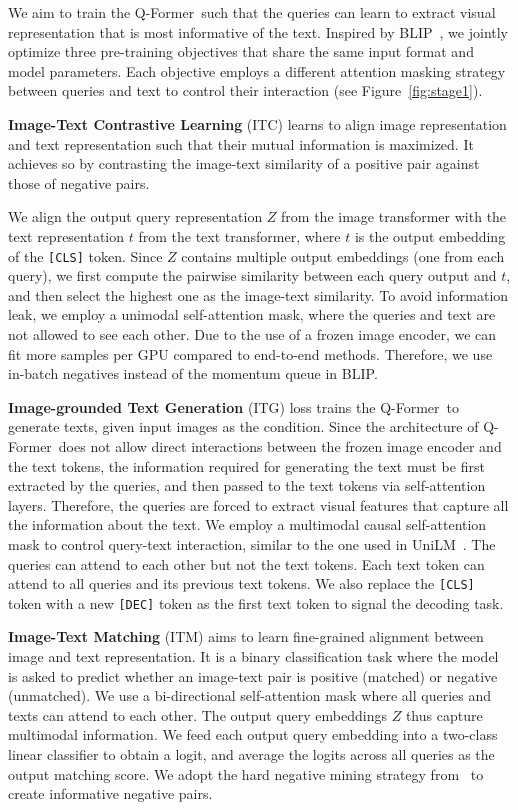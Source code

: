 We aim to train the Q-Former~such that the queries can learn to extract visual representation that is most informative of the text. Inspired by BLIP~\cite{blip}, we jointly optimize three pre-training objectives that share the same input format and model parameters. Each objective employs a different attention masking strategy between queries and text to control their interaction (see Figure~\ref{fig:stage1}).

\textbf{Image-Text Contrastive Learning} (ITC) learns to align image representation and text representation such that their mutual information is maximized. It achieves so by contrasting the image-text similarity of a positive pair against those of negative pairs.

We align the output query representation $Z$ from the image transformer with the text representation $t$ from the text transformer, where $t$ is the output embedding of the \texttt{[CLS]} token. Since $Z$ contains multiple output embeddings (one from each query), we first compute the pairwise similarity between each query output and $t$, and then select the highest one as the image-text similarity. To avoid information leak, we employ a unimodal self-attention mask, where the queries and text are not allowed to see each other. Due to the use of a frozen image encoder, we can fit more samples per GPU compared to end-to-end methods. Therefore, we use in-batch negatives instead of the momentum queue in BLIP.

\textbf{Image-grounded Text Generation} (ITG) loss trains the Q-Former~to generate texts, given input images as the condition. Since the architecture of Q-Former~does not allow direct interactions between the frozen image encoder and the text tokens, the information required for generating the text must be first extracted by the queries, and then passed to the text tokens via self-attention layers. Therefore, the queries are forced to extract visual features that capture all the information about the text. We employ a multimodal causal self-attention mask to control query-text interaction, similar to the one used in UniLM~\cite{UniLM}. The queries can attend to each other but not the text tokens. Each text token can attend to all queries and its previous text tokens. We also replace the \texttt{[CLS]} token with a new \texttt{[DEC]} token as the first text token to signal the decoding task.

\textbf{Image-Text Matching} (ITM) aims to learn fine-grained alignment between image and text representation. It is a binary classification task where the model is asked to predict whether an image-text pair is positive (matched) or negative (unmatched). We use a bi-directional self-attention mask where all queries and texts can attend to each other. The output query embeddings $Z$ thus capture multimodal information. We feed each output query embedding into a two-class linear classifier to obtain a logit, and average the logits across all queries as the output matching score. We adopt the hard negative mining strategy from~\citet{ALBEF,blip} to create informative negative pairs.

